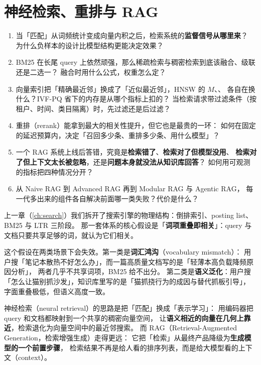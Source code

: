 \chapter{神经检索、重排与 RAG}
\label{ch:rag}

\begin{insight}[本章要解决的问题]
\begin{enumerate}
  \item 当「匹配」从词频统计变成向量内积之后，检索系统的\textbf{监督信号从哪里来}？
        为什么负样本的设计比模型结构更能决定效果？
  \item BM25 在长尾 query 上依然顽强，那么稀疏检索与稠密检索到底该融合、级联还是二选一？
        融合时用什么公式，权重怎么定？
  \item 向量索引把「精确最近邻」换成了「近似最近邻」，HNSW 的 $M$、、
        各自在换什么？IVF-PQ 省下的内存是从哪个指标上扣的？
        当检索请求带过滤条件（按租户、时间、类目隔离）时，先过滤还是后过滤？
  \item 重排（rerank）能拿到最大的相关性提升，但它也是最贵的一环：
        如何在固定的延迟预算内，决定「召回多少条、重排多少条、用什么模型」？
  \item 一个 RAG 系统上线后答错，究竟是\textbf{检索错了}、\textbf{检索对了但模型没用}、
        \textbf{检索对了但上下文太长被忽略}，还是\textbf{问题本身就没法从知识库回答}？
        如何用可观测的指标把四种情况分开？
  \item 从 Naive RAG 到 Advanced RAG 再到 Modular RAG 与 Agentic RAG，
        每一代多出来的组件各自解决前面哪一类失败？代价是什么？
\end{enumerate}
\end{insight}

上一章（\cref{ch:search}）我们拆开了搜索引擎的物理结构：倒排索引、posting list、BM25 与 LTR 三阶段。
那一套体系的核心假设是「\textbf{词项重叠即相关}」：query 与文档只要共享足够的词，就认为它们相关。

这个假设在两类场景下会失效。第一类是\textbf{词汇鸿沟}（vocabulary mismatch）：
用户搜「笔记本散热不好怎么办」，而一篇高质量文档写的是「轻薄本高负载降频原因分析」，
两者几乎不共享词项，BM25 给不出分。
第二类是\textbf{语义泛化}：用户搜「怎么让猫别抓沙发」，知识库里写的是「猫抓挠行为的成因与替代抓板引导」，
字面重叠极低，但语义高度一致。

神经检索（neural retrieval）的思路是把「匹配」换成「表示学习」：
用编码器把 query 和文档都映射到一个共享的稠密向量空间，
让\textbf{语义相近的向量在几何上靠近}，检索退化为向量空间中的最近邻搜索。
而 RAG（Retrieval-Augmented Generation，检索增强生成）走得更远：
它把「检索」从最终产品降级为\textbf{生成模型的一个前置步骤}，
检索结果不再是给人看的排序列表，而是给大模型看的上下文（context）。

